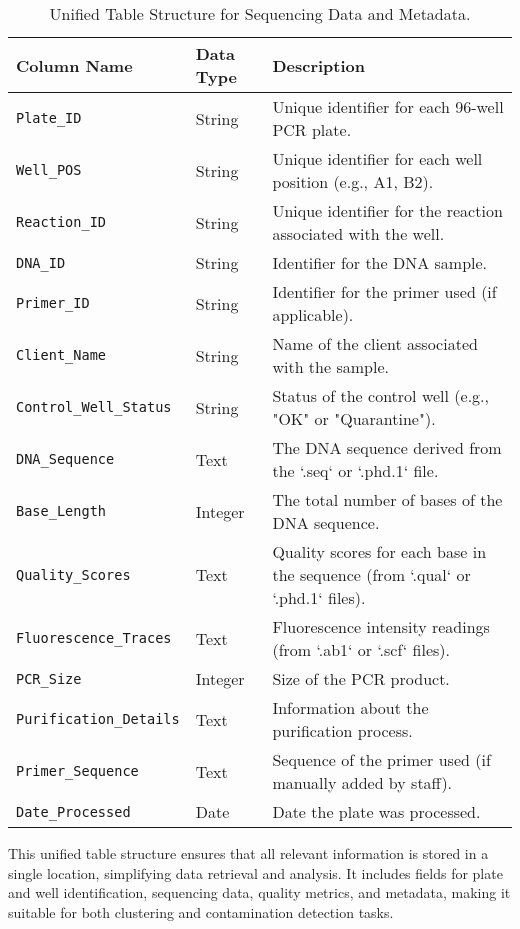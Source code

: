 \begin{table}[H]
  \centering
  \begin{tabular}{|l|l|p{8cm}|}
    \hline
    \textbf{Column Name} & \textbf{Data Type} & \textbf{Description} \\ \hline
    \texttt{Plate\_ID} & String & Unique identifier for each 96-well PCR plate. \\ \hline
    \texttt{Well\_POS} & String & Unique identifier for each well position (e.g., A1, B2). \\ \hline
    \texttt{Reaction\_ID} & String & Unique identifier for the reaction associated with the well. \\ \hline
    \texttt{DNA\_ID} & String & Identifier for the DNA sample. \\ \hline
    \texttt{Primer\_ID} & String & Identifier for the primer used (if applicable). \\ \hline
    \texttt{Client\_Name} & String & Name of the client associated with the sample. \\ \hline
    \texttt{Control\_Well\_Status} & String & Status of the control well (e.g., "OK" or "Quarantine"). \\ \hline
    \texttt{DNA\_Sequence} & Text & The DNA sequence derived from the `.seq` or `.phd.1` file. \\ \hline
    \texttt{Base\_Length} & Integer & The total number of bases of the DNA sequence. \\ \hline
    \texttt{Quality\_Scores} & Text & Quality scores for each base in the sequence (from `.qual` or `.phd.1` files). \\ \hline
    \texttt{Fluorescence\_Traces} & Text & Fluorescence intensity readings (from `.ab1` or `.scf` files). \\ \hline
    \texttt{PCR\_Size} & Integer & Size of the PCR product. \\ \hline
    \texttt{Purification\_Details} & Text & Information about the purification process. \\ \hline
    \texttt{Primer\_Sequence} & Text & Sequence of the primer used (if manually added by staff). \\ \hline
    \texttt{Date\_Processed} & Date & Date the plate was processed. \\ \hline
  \end{tabular}
  \caption{Unified Table Structure for Sequencing Data and Metadata.}
  \label{tab:unified_table}
\end{table}

This unified table structure ensures that all relevant information is stored in a single location, simplifying data retrieval and analysis. It includes fields for plate and well identification, sequencing data, quality metrics, and metadata, making it suitable for both clustering and contamination detection tasks.

